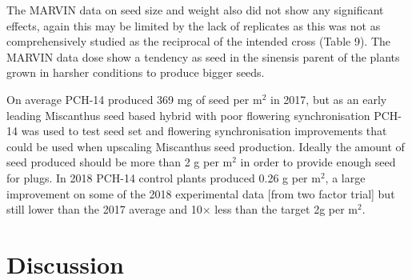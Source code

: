 \documentclass[fleqn, 15pt, lineno]{olplainarticle}
\begin{document}
The MARVIN data on seed size and weight also did not show any significant effects, again this may be limited by the lack of replicates as this was not as comprehensively studied as the reciprocal of the intended cross (Table 9).
The MARVIN data dose show a tendency as seed in the sinensis parent of the plants grown in harsher conditions to produce bigger seeds.





On average PCH-14 produced 369 mg of seed per m$^2$ in 2017, but as an early leading Miscanthus seed based hybrid with poor flowering synchronisation PCH-14 was used to test seed set and flowering synchronisation improvements that could be used when upscaling Miscanthus seed production.
Ideally the amount of seed produced should be more than 2 g per m$^2$ in order to provide enough seed for plugs.
In 2018 PCH-14 control plants produced 0.26 g per m$^2$, a large improvement on some of the 2018 experimental data [from two factor trial] but still lower than the 2017 average and 10$\times$ less than the target 2g per m$^2$.



\FloatBarrier
\section{Discussion}




\FloatBarrier
\end{document}
